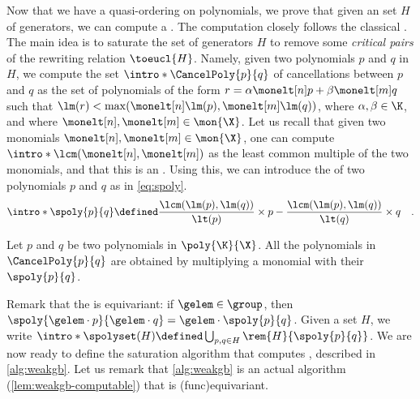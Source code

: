 \AP Now that we have a quasi-ordering on polynomials, we prove that given
an  set $H$ of generators, we can compute a . The computation closely follows the classical
. The main idea is to saturate the set of
generators $H$ to remove some \emph{critical pairs} of the rewriting relation
$\toeucl{H}$. Namely, given two polynomials $p$ and $q$ in $H$, we compute the
set $\intro*\CancelPoly{p}{q}$ of cancellations between $p$ and $q$ as the set of
polynomials of the form $r = \alpha \monelt[n] p + \beta \monelt[m] q$ such
that $\lm(r) < \max(\monelt[n] \lm(p), \monelt[m]\lm(q))$, where $\alpha,\beta
\in \K$, and where $\monelt[n], \monelt[m] \in \mon{\X}$. Let us recall that
given two monomials $\monelt[n], \monelt[m] \in \mon{\X}$, one can compute
$\intro*\lcm(\monelt[n], \monelt[m])$ as the least common multiple of the two
monomials, and that this is an .
Using this, we can introduce the  of two polynomials $p$ and $q$
as in \cref{eq:spoly}.
 \begin{equation}
    \label{eq:spoly}
    \intro*\spoly{p}{q} \defined
    \frac{\lcm(\lm(p), \lm(q))}{\lt(p)} \times p
    - \frac{\lcm(\lm(p), \lm(q))}{\lt(q)} \times q
    \quad .
  \end{equation}



\begin{lemma}[restate=lem:spoly,name={S-polynomials}]
  \label{lem:spoly}
  Let $p$ and $q$ be two polynomials in $\poly{\K}{\X}$.
  All the polynomials in $\CancelPoly{p}{q}$ are obtained by multiplying a monomial
  with
  their  $\spoly{p}{q}$.
\end{lemma}


Remark that the  is equivariant: if $\gelem \in \group$, then
$\spoly{\gelem \cdot p}{\gelem \cdot q} = \gelem \cdot \spoly{p}{q}$. Given a
set $H$, we write $\intro*\spolyset(H) \defined \bigcup_{p,q \in H}
\rem{H}{\spoly{p}{q}}$. We are now ready to define the saturation algorithm
that computes , described in
\cref{alg:weakgb}.
Let us remark that \cref{alg:weakgb}
is an actual algorithm (\cref{lem:weakgb-computable}) that is
\kl(func){equivariant}.

